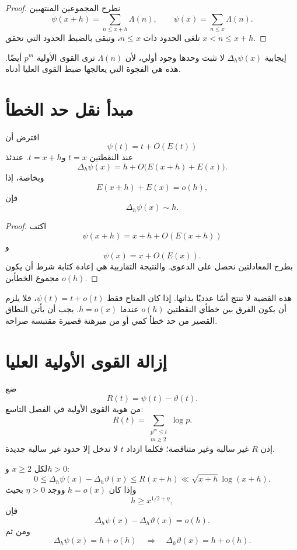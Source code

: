 \begin{proof}
نطرح المجموعين المنتهيين
\[
\psi(x+h)=\sum_{n\le x+h}\Lambda(n),
\qquad
\psi(x)=\sum_{n\le x}\Lambda(n).
\]
تلغى الحدود ذات \(n\le x\)، وتبقى بالضبط الحدود التي تحقق \(x<n\le x+h\).
\end{proof}

إيجابية \(\Delta_h\psi(x)\) لا تثبت وحدها وجود أولي، لأن \(\Lambda(n)\) ترى القوى الأولية \(p^m\) أيضًا. هذه هي الفجوة التي يعالجها ضبط القوى العليا أدناه.

\section{مبدأ نقل حد الخطأ}

\begin{proposition}
\label{prop:error-transfer-short-interval}
\provedhere
افترض أن
\[
\psi(t)=t+O(E(t))
\]
عند النقطتين \(t=x\) و\(t=x+h\). عندئذ
\[
\Delta_h\psi(x)
=
h+O\bigl(E(x+h)+E(x)\bigr).
\]
وبخاصة، إذا
\[
E(x+h)+E(x)=o(h),
\]
فإن
\[
\Delta_h\psi(x)\sim h.
\]
\end{proposition}

\begin{proof}
اكتب
\[
\psi(x+h)=x+h+O(E(x+h))
\]
و
\[
\psi(x)=x+O(E(x)).
\]
بطرح المعادلتين نحصل على الدعوى. والنتيجة التقاربية هي إعادة كتابة شرط أن يكون مجموع الخطأين \(o(h)\).
\end{proof}

\begin{remark}
هذه القضية لا تنتج أسًا عدديًا بذاتها. إذا كان المتاح فقط \(\psi(t)=t+o(t)\)، فلا يلزم أن يكون الفرق بين خطأي النقطتين \(o(h)\) عندما \(h=o(x)\). يجب أن يأتي النطاق القصير من حد خطأ كمي أو من مبرهنة قصيرة مقتبسة صراحة.
\end{remark}

\section{إزالة القوى الأولية العليا}

ضع
\[
R(t)=\psi(t)-\vartheta(t).
\]
من هوية القوى الأولية في الفصل التاسع:
\[
R(t)
=
\sum_{\substack{p^m\le t\\m\ge2}}\log p.
\]
إذن \(R\) غير سالبة وغير متناقصة؛ فكلما ازداد \(t\) لا تدخل إلا حدود غير سالبة جديدة.

\begin{lemma}
\label{lem:higher-prime-powers-short-interval}
\provedhere
لكل \(x\ge2\) و\(h>0\):
\[
0\le
\Delta_h\psi(x)-\Delta_h\vartheta(x)
\le
R(x+h)
\ll
\sqrt{x+h}\log(x+h).
\]
وإذا كان \(h=o(x)\) ووجد \(\eta>0\) بحيث
\[
h\ge x^{1/2+\eta},
\]
فإن
\[
\Delta_h\psi(x)-\Delta_h\vartheta(x)=o(h).
\]
ومن ثم
\[
\Delta_h\psi(x)
=
h+o(h)
\quad\Longrightarrow\quad
\Delta_h\vartheta(x)=h+o(h).
\]
\end{lemma}

